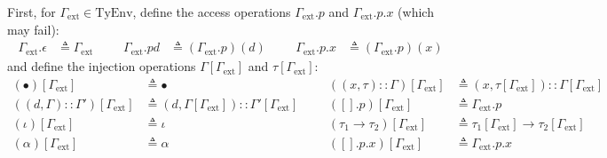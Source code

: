 \documentclass{article}
\theoremstyle{definition}
\newcommand*{\cons}{::}
\newcommand*{\modid}{d}
\newcommand*{\TyEnv}{\text{TyEnv}}
\newcommand*{\external}{\Gamma_{\text{ext}}}
\begin{document}
First, for $\external\in\TyEnv$, define the access operations $\external.p$ and $\external.p.x$ (which may fail):
\begin{align*}
  \external.\epsilon & \triangleq\external &  &  & \external.p\modid & \triangleq(\external.p)(\modid) &  &  & \external.p.x & \triangleq(\external.p)(x)
\end{align*}
and define the injection operations $\Gamma[\external]$ and $\tau[\external]$:
\begin{align*}
  (\bullet)[\external]                     & \triangleq\bullet                                           &  &  & ((x,\tau)\cons\Gamma)[\external]     & \triangleq(x,\tau[\external])\cons\Gamma[\external]     \\
  ((\modid,\Gamma)\cons\Gamma')[\external] & \triangleq(\modid,\Gamma[\external])\cons\Gamma'[\external] &  &  & ([].p)[\external]                    & \triangleq\external.p                                   \\
  (\iota)[\external]                       & \triangleq\iota                                             &  &  & (\tau_1\rightarrow\tau_2)[\external] & \triangleq\tau_1[\external]\rightarrow\tau_2[\external] \\
  (\alpha)[\external]                      & \triangleq\alpha                                            &  &  & ([].p.x)[\external]                  & \triangleq\external.p.x
\end{align*}
\end{document}
